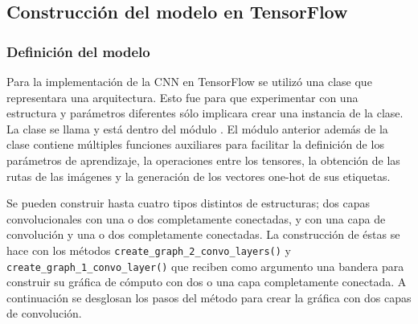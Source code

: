 
\subsection{Construcción del modelo en TensorFlow}
\label{\detokenize{model_desc:creacion-y-ejecucion-de-la-grafica-de-tensorflow}}

\subsubsection{Definición del modelo}

Para la implementación de la CNN en TensorFlow
se utilizó una clase que representara una
arquitectura. Esto fue para que experimentar con
una estructura y parámetros diferentes sólo
implicara crear una instancia de la clase.
La clase se llama  y
está dentro del módulo .
El módulo anterior además de la clase contiene múltiples
funciones auxiliares para facilitar la definición
de los parámetros de aprendizaje, la operaciones entre los
tensores, la obtención de las rutas de las imágenes
y la generación de los vectores one-hot de sus etiquetas.

Se pueden construir hasta cuatro tipos distintos de
estructuras; dos capas convolucionales con una o dos
completamente conectadas, y con una capa de convolución
y una o dos completamente conectadas.
La construcción de éstas se hace con los métodos
\texttt{create\_graph\_2\_convo\_layers()}
y \texttt{create\_graph\_1\_convo\_layer()}
que reciben como argumento una bandera para construir su gráfica
de cómputo con dos o una capa completamente conectada. A
continuación se desglosan los pasos del método para
crear la gráfica con dos capas de convolución.

